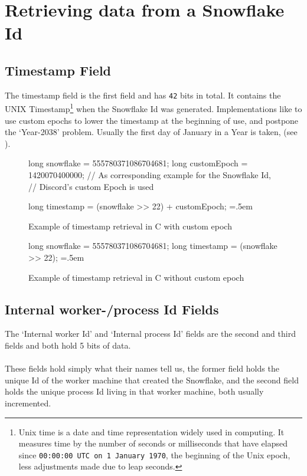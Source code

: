 \documentclass{article}
\newcommand{\code}[1]{\colorbox{cverbbg}{\texttt{#1}}}
\newcommand{\hn}[0]{\hfill \\}
\newenvironment{lcverbatim}
{\SaveVerbatim{cverb}}
{\endSaveVerbatim{}
	\flushleft\fboxrule=0pt\fboxsep=.5em
	\colorbox{cverbbg}{%

		\makebox[\dimexpr\linewidth-2\fboxsep][l]{\BUseVerbatim{cverb}}%
	}
	\endflushleft{}
}
\begin{document}
\pagebreak

\section{Retrieving data from a Snowflake Id}

\subsection{Timestamp Field}
The timestamp field is the first field and has \code{42} bits in total. It
contains the UNIX Timestamp\footnote{Unix time is a date and time
	representation widely used in computing. It measures time by the number
	of
	seconds or milliseconds that have elapsed since \texttt{00:00:00 UTC on
		1
		January 1970}, the beginning of the Unix epoch, less
	adjustments made
	due to
	leap seconds.} when the Snowflake Id was generated. Implementations
like to
use
custom epochs to lower the timestamp at the beginning of use, and postpone the
`Year-2038' problem. Usually the first day of January in a Year is taken, (see ).

\begin{figure}[H]
	\begin{lcverbatim}
	long snowflake = 555780371086704681;
	long customEpoch = 1420070400000;
	// As corresponding example for the Snowflake Id,
	// Discord's custom Epoch is used

	long timestamp = (snowflake >> 22) + customEpoch;
	\end{lcverbatim}
	\caption{Example of timestamp retrieval in C with custom
		epoch}\label{fig:r_timestamp_1}
\end{figure}

\begin{figure}[H]
	\begin{lcverbatim}
	long snowflake = 555780371086704681;
	long timestamp = (snowflake >> 22);
	\end{lcverbatim}
	\caption{Example of timestamp retrieval in C without custom
		epoch}\label{fig:r_timestamp_2}
\end{figure}

\subsection{Internal worker-/process Id Fields}
The `Internal worker Id' and `Internal process Id' fields are the second and
third fields and both hold 5 bits of data. \\
\hn{}
These fields hold simply what their names tell us, the former field holds the
unique Id of the worker machine that created the Snowflake, and the second
field holds the unique process Id living in that worker machine, both usually
incremented. \\
\end{document}
